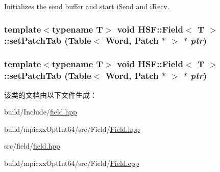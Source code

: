 Initializes the send buffer and start iSend and iRecv. \hypertarget{classHSF_1_1Field_aed5ee473bb4d75234e5ae9c73131a56a}{
\subsubsection[{setPatchTab}]{\setlength{\rightskip}{0pt plus 5cm}template$<$typename T$>$ void {\bf HSF::Field}$<$ T $>$::setPatchTab (Table$<$ Word, {\bf Patch} $\ast$ $>$ $\ast$ {\em ptr})}}
\label{classHSF_1_1Field_aed5ee473bb4d75234e5ae9c73131a56a}
\hypertarget{classHSF_1_1Field_aed5ee473bb4d75234e5ae9c73131a56a}{
\subsubsection[{setPatchTab}]{\setlength{\rightskip}{0pt plus 5cm}template$<$typename T$>$ void {\bf HSF::Field}$<$ T $>$::setPatchTab (Table$<$ Word, {\bf Patch} $\ast$ $>$ $\ast$ {\em ptr})}}
\label{classHSF_1_1Field_aed5ee473bb4d75234e5ae9c73131a56a}


该类的文档由以下文件生成：\begin{DoxyCompactItemize}
\item 
build/Include/\hyperlink{build_2Include_2field_8hpp}{field.hpp}\item 
build/mpicxxOptInt64/src/Field/\hyperlink{Field_8hpp}{Field.hpp}\item 
src/field/\hyperlink{src_2field_2field_8hpp}{field.hpp}\item 
build/mpicxxOptInt64/src/Field/\hyperlink{Field_8cpp}{Field.cpp}\end{DoxyCompactItemize}
